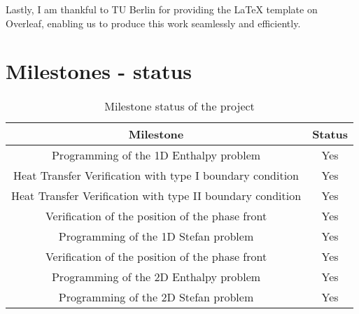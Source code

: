 Lastly, I am thankful to TU Berlin for providing the LaTeX template on Overleaf, enabling us to produce this work seamlessly and efficiently.
\newpage
\section{Milestones - status\label{sec:Milestone}}


\begin{table}[h]
    \centering
    \begin{tabular}{|c|c|} \hline 
         Milestone& Status\\ \hline 
         Programming of the 1D Enthalpy problem& Yes\\ \hline 
         Heat Transfer Verification with type I boundary condition& Yes\\ \hline 
         Heat Transfer Verification with type II boundary condition& Yes\\ \hline 
         Verification of the position of the phase front& Yes\\ \hline 
         Programming of the 1D Stefan problem& Yes\\ \hline 
         Verification of the position of the phase front & Yes\\ \hline 
         Programming of the 2D Enthalpy problem& Yes\\ \hline 
 Programming of the 2D Stefan problem &Yes\\ \hline
    \end{tabular}
    \caption{Milestone status of the project}
    \label{tab:Milestone status}
\end{table}

